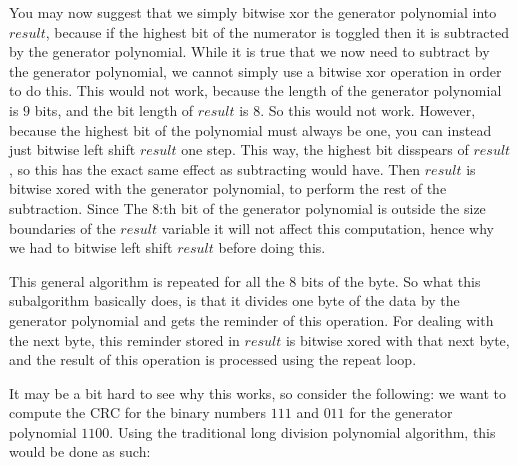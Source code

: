 You may now suggest that we simply bitwise xor the generator
polynomial into $result$, because if the highest bit of the numerator
is toggled then it is subtracted by the generator polynomial. While it
is true that we now need to subtract by the generator polynomial, we
cannot simply use a bitwise xor operation in order to do this. This
would not work, because the length of the generator polynomial is $9$
bits, and the bit length of $result$ is $8$. So this would not
work. However, because the highest bit of the polynomial must always
be one, you can instead just bitwise left shift $result$ one
step. This way, the highest bit disspears of $result$, so this has the
exact same effect as subtracting would have. Then $result$ is bitwise
xored with the generator polynomial, to perform the rest of the
subtraction. Since The $8$:th bit of the generator polynomial is
outside the size boundaries of the $result$ variable it will not
affect this computation, hence why we had to bitwise left shift
$result$ before doing this.

This general algorithm is repeated for all the 8 bits of the byte. So
what this subalgorithm basically does, is that it divides one byte of
the data by the generator polynomial and gets the reminder of this
operation. For dealing with the next byte, this reminder stored in
$result$ is bitwise xored with that next byte, and the result of this
operation is processed using the repeat loop.

It may be a bit hard to see why this works, so consider the following:
we want to compute the CRC for the binary numbers $111$ and $011$ for
the generator polynomial $1100$. Using the traditional long division
polynomial algorithm, this would be done as such:

